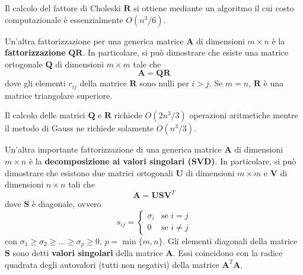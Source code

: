 Il calcolo del fattore di Choleski $\mathbf{R}$ si ottiene mediante un algoritmo il cui costo
computazionale è essenzialmente $O(n^3/6)$.

Un'altra fattorizzazione per una generica matrice $\mathbf{A}$ di dimensioni $m\times n$ è la
\textbf{fattorizzazione} $\mathbf{QR}$. In particolare, si può dimostrare che esiste una matrice
ortogonale $\mathbf{Q}$ di dimensioni $m\times m$ tale che
\[\mathbf{A}=\mathbf{QR}\]
dove gli elementi $r_{ij}$ della matrice $\mathbf{R}$ sono nulli per $i>j$. Se $m=n$, $\mathbf{R}$
è una matrice triangolare superiore.

Il calcolo delle matrici $\mathbf{Q}$ e $\mathbf{R}$ richiede $O(2n^3/3)$ operazioni aritmetiche
mentre il metodo di Gauss ne richiede solamente $O(n^3/3)$.

Un'altra importante fattorizzazione di una generica matrice $\mathbf{A}$ di dimensioni $m\times n$
è la \textbf{decomposizione ai valori singolari (SVD)}. In particolare, si può dimostrare
che esistono due matrici ortogonali $\mathbf{U}$ di dimensioni $m\times m$ e $\mathbf{V}$ di
dimensioni $n\times n$ tali che
\[\mathbf{A}=\mathbf{USV}^T\]
dove $\mathbf{S}$ è diagonale, ovvero
\[s_{ij}=\begin{cases}
    \sigma_i & \text{se }i=j \\
    0 & \text{se }i\ne j
\end{cases}\]
con $\sigma_1\geq\sigma_2\geq\dots\geq\sigma_p\geq0,\,p=\min\{m,n\}$. Gli elementi diagonali della matrice
$\mathbf{S}$ sono detti \textbf{valori singolari} della matrice $\mathbf{A}$. Essi coincidono con la
radice quadrata degli autovalori (tutti non negativi) della matrice $\mathbf{A}^T\mathbf{A}$.\newpage
